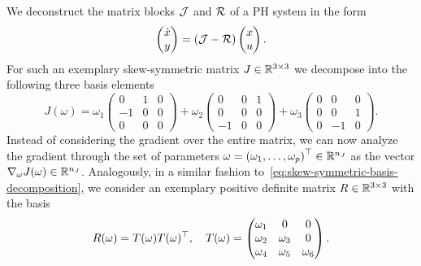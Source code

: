 We deconstruct the matrix blocks $\mathcal{J}$ and $\mathcal{R}$ of a \ac{PH} system in the form
\begin{equation*}
    \begin{pmatrix}
        \dot{x} \\
        y
    \end{pmatrix} = (\mathcal{J} - \mathcal{R}) \begin{pmatrix}
        x \\
        u
    \end{pmatrix}.
\end{equation*}
For such an exemplary skew-symmetric matrix $J \in \mathbb{R}^{3 \times 3}$ we decompose into the following three basis elements
\begin{equation}\label{eq:skew-symmetric-basis-decomposition}
    J(\omega) = \omega_1 \begin{pmatrix}
        0 & 1 & 0 \\
        -1 & 0 & 0 \\
        0 & 0 & 0
    \end{pmatrix} + \omega_2 \begin{pmatrix}
        0 & 0 & 1 \\
        0 & 0 & 0 \\
        -1 & 0 & 0
    \end{pmatrix} + \omega_3 \begin{pmatrix}
        0 & 0 & 0 \\
        0 & 0 & 1 \\
        0 & -1 & 0
    \end{pmatrix}.
\end{equation}
Instead of considering the gradient over the entire matrix, we can now analyze the gradient through the set of parameters $\omega = {(\omega_1, \dots, \omega_p)}^{\top} \in \mathbb{R}^{n_J}$ as the vector $\nabla_\omega J(\omega) \in \mathbb{R}^{n_J}$.
Analogously, in a similar fashion to~\eqref{eq:skew-symmetric-basis-decomposition}, we consider an exemplary positive definite matrix $R \in \mathbb{R}^{3 \times 3}$ with the basis
\begin{equation}\label{eq:spsd-basis-decomposition}
    R(\omega) = T(\omega) T(\omega)^{\top},\quad T(\omega) = \begin{pmatrix}
        \omega_1 & 0 & 0 \\
        \omega_2 & \omega_3 & 0 \\
        \omega_4 & \omega_5 & \omega_6
    \end{pmatrix}.
\end{equation}
